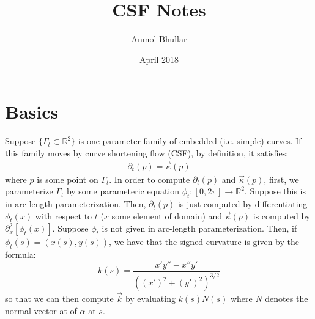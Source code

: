 \documentclass{article}
\title{CSF Notes}
\author{Anmol Bhullar}
\date{April 2018}
\begin{document}
\maketitle

\section{Basics}

Suppose $\{\Gamma_t\subset\mathbb{R}^2\}$ is one-parameter family of embedded (i.e. simple) curves. If
this family moves by curve shortening flow (CSF), by definition, it satisfies:
\begin{align} \tag{1.1}
    \partial_t (p) = \vec{\kappa}(p)
\end{align}
where $p$ is some point on $\Gamma_t$. In order to compute $\partial_t(p)$ and $\vec{\kappa}(p)$, first, we
parameterize $\Gamma_t$ by some parameteric equation $\phi_t:[0,2\pi]\to\mathbb{R}^2$. Suppose this is in
arc-length parameterization. Then, $\partial_t(p)$ is just computed by differentiating $\phi_t(x)$ 
with respect to $t$ ($x$ some element of domain) and $\vec{\kappa}(p)$ is computed by $\partial_x^2[\phi_t(x)]$.
Suppose $\phi_t$ is not given in arc-length parameterization. Then, if $\phi_t(s) = (x(s),y(s))$, we have that the
signed curvature is given by the formula:
\[ k(s) = \frac{x'y''-x''y'}{((x')^2+(y')^2)^{3/2}}\]
so that we can then compute $\vec{k}$ by evaluating $k(s)N(s)$ where $N$ denotes the normal vector at of $\alpha$ at 
$s$.
\end{document}
